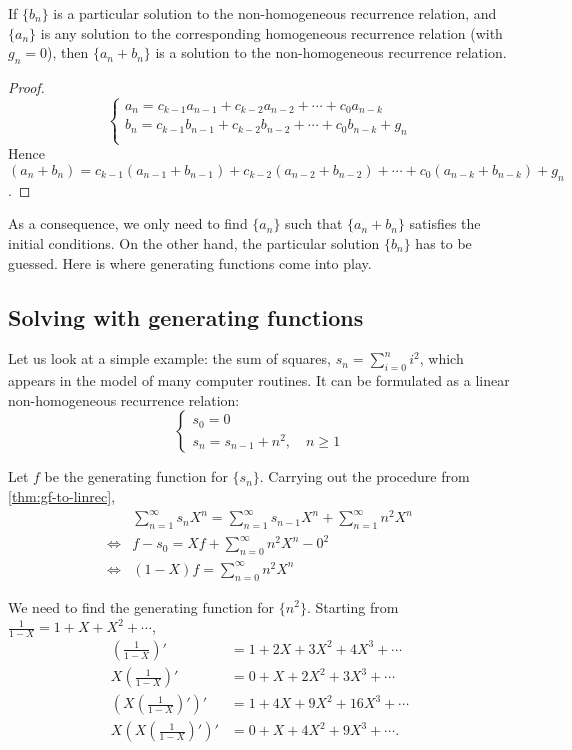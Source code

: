 \documentclass[a4paper, 12pt]{report}
\begin{document}
\begin{prop}
If $\{b_n\}$ is a particular solution to the non-homogeneous recurrence relation, and $\{a_n\}$ is any solution to the corresponding homogeneous recurrence relation (with $g_n = 0$), then $\{a_n + b_n\}$ is a solution to the non-homogeneous recurrence relation.
\end{prop}

\begin{proof}
\[\begin{cases}
    a_n = c_{k - 1}a_{n - 1} + c_{k - 2}a_{n - 2} + \cdots + c_0 a_{n - k} \\
    b_n = c_{k - 1}b_{n - 1} + c_{k - 2}b_{n - 2} + \cdots + c_0 b_{n - k} + g_n\\
    \end{cases}
\]
Hence $(a_n + b_n) = c_{k - 1}(a_{n - 1} + b_{n - 1}) + c_{k - 2}(a_{n - 2} + b_{n - 2}) + \cdots + c_0 (a_{n - k} + b_{n - k}) + g_n$.
\end{proof}
As a consequence, we only need to find $\{a_n\}$ such that $\{a_n + b_n\}$ satisfies the initial conditions. On the other hand, the particular solution $\{b_n\}$ has to be guessed. Here is where generating functions come into play.

\subsection{Solving with generating functions}
Let us look at a simple example: the sum of squares, $s_n = \sum_{i = 0}^n i^2$, which appears in the model of many computer routines. It can be formulated as a linear non-homogeneous recurrence relation:
\[
\begin{cases}
s_0 = 0\\
s_n = s_{n - 1} + n^2, \quad n \geq 1
\end{cases}
\]

Let $f$ be the generating function for $\{s_n\}$. Carrying out the procedure from \cref{thm:gf-to-linrec},
\begin{align*}
&\sum_{n = 1}^\infty s_n X^n = \sum_{n = 1}^\infty s_{n - 1}X^n + \sum_{n = 1}^\infty n^2 X^n\\
\iff &f - s_0 = X f + \sum_{n = 0}^\infty n^2 X^n - 0^2\\
\iff &(1 - X)f = \sum_{n = 0}^\infty n^2 X^n
\end{align*}

We need to find the generating function for $\{n^2\}$. Starting from $\frac{1}{1 - X} = 1 + X + X^2 + \cdots$,
\begin{align*}
    \left(\frac{1}{1 - X}\right)' &= 1 + 2X + 3X^2 + 4X^3 + \cdots\\
    X \left(\frac{1}{1 - X}\right)' &= 0 + X + 2X^2 + 3 X^3 + \cdots\\
    \left(X \left(\frac{1}{1 - X}\right)'\right)' &= 1 + 4X + 9X^2 + 16X^3 + \cdots\\
    X \left(X \left(\frac{1}{1 - X}\right)'\right)' &= 0 + X + 4X^2 + 9 X^3 + \cdots.
\end{align*}
\end{document}
